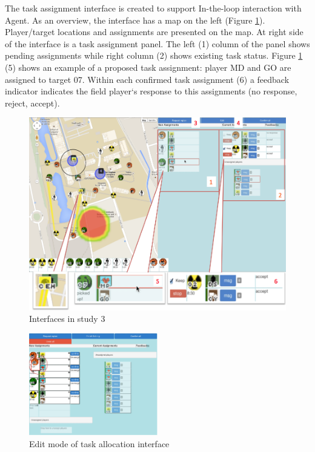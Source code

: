 The task assignment interface is created to support In-the-loop interaction with Agent. As an overview, the interface has a map on the left (Figure \ref{fig:study3TAinterface}). Player/target locations and assignments are presented on the map. At right side of the interface is a task assignment panel. The left (1) column of the panel shows pending assignments while right column (2) shows existing task status. Figure  \ref{fig:study3TAinterface} (5) shows an example of a proposed task assignment: player MD and GO are assigned to target 07. Within each confirmed task assignment (6) a feedback indicator indicates the field player`s response to this assignments (no response, reject, accept).\\

\begin{figure}[h]
  \centering
  \includegraphics[width=1\textwidth]{img/study3/system/HQ1Interface}
  \caption{Interfaces in study 3}
  \label{fig:study3TAinterface}
\end{figure}

\begin{figure}[h]
  \centering
  \includegraphics[width=0.5\textwidth]{img/study3/system/editmode}
  \caption{Edit mode of task allocation interface}
  \label{fig:study3editmode}
\end{figure}


